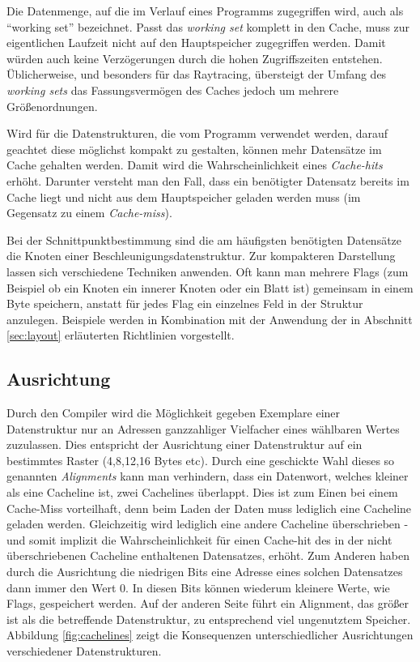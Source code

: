 Die Datenmenge, auf die im Verlauf eines Programms zugegriffen wird, auch als ``working set'' bezeichnet. Passt das \textit{working set} komplett in den Cache, muss zur eigentlichen Laufzeit nicht auf den Hauptspeicher zugegriffen werden. Damit würden auch keine Verzögerungen durch die hohen Zugriffszeiten entstehen.
Üblicherweise, und besonders für das Raytracing, übersteigt der Umfang des \textit{working sets} das Fassungsvermögen des Caches jedoch um mehrere Größenordnungen.

Wird für die Datenstrukturen, die vom Programm verwendet werden, darauf geachtet diese möglichst kompakt zu gestalten, können mehr Datensätze im Cache gehalten werden. Damit wird die Wahrscheinlichkeit eines \textit{Cache-hits} erhöht. Darunter versteht man den Fall, dass ein benötigter Datensatz bereits im Cache liegt und nicht aus dem Hauptspeicher geladen werden muss (im Gegensatz zu einem \textit{Cache-miss}).

Bei der Schnittpunktbestimmung sind die am häufigsten benötigten Datensätze die Knoten einer Beschleunigungsdatenstruktur.
Zur kompakteren Darstellung lassen sich verschiedene Techniken anwenden. Oft kann man mehrere Flags (zum Beispiel ob ein Knoten ein innerer Knoten oder ein Blatt ist) gemeinsam in einem Byte speichern, anstatt für jedes Flag ein einzelnes Feld in der Struktur anzulegen.
Beispiele werden in Kombination mit der Anwendung der in Abschnitt \ref{sec:layout} erläuterten Richtlinien vorgestellt.

\subsection{Ausrichtung}

Durch den Compiler wird die Möglichkeit gegeben Exemplare einer Datenstruktur nur an Adressen ganzzahliger Vielfacher eines wählbaren Wertes zuzulassen. Dies entspricht der Ausrichtung einer Datenstruktur auf ein bestimmtes Raster (4,8,12,16 Bytes etc). Durch eine geschickte Wahl dieses so genannten \textit{Alignments} kann man verhindern, dass ein Datenwort, welches kleiner als eine Cacheline ist, zwei Cachelines überlappt.
Dies ist zum Einen bei einem Cache-Miss vorteilhaft, denn beim Laden der Daten muss lediglich eine Cacheline geladen werden. Gleichzeitig wird lediglich eine andere Cacheline überschrieben - und somit implizit die Wahrscheinlichkeit für einen Cache-hit des in der nicht überschriebenen Cacheline enthaltenen Datensatzes, erhöht.
Zum Anderen haben durch die Ausrichtung die niedrigen Bits eine Adresse eines solchen Datensatzes dann immer den Wert 0. In diesen Bits können wiederum kleinere Werte, wie Flags, gespeichert werden.
Auf der anderen Seite führt ein Alignment, das größer ist als die betreffende Datenstruktur, zu entsprechend viel ungenutztem Speicher. Abbildung \ref{fig:cachelines} zeigt die Konsequenzen unterschiedlicher Ausrichtungen verschiedener Datenstrukturen.

